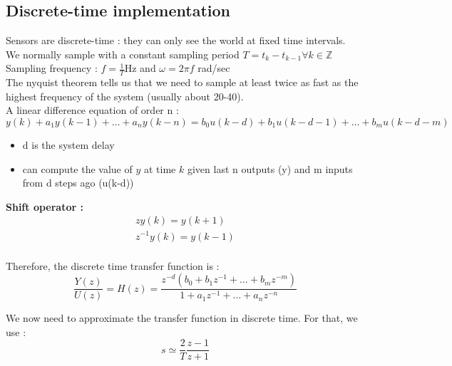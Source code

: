 \documentclass[../main.tex]{subfiles}
\begin{document}
\subsection{Discrete-time implementation}
Sensors are discrete-time : they can only see the world at fixed time intervals.\\

We normally sample with a constant sampling period $T = t_k - t_{k-1} \forall k\in \mathbb{Z}$\\
Sampling frequency : $f = \frac{1}{T}$Hz and $\omega = 2\pi f$ rad/sec\\

The nyquist theorem tells us that we need to sample at least twice as fast as the highest frequency of the system (usually about 20-40).\\

A linear difference equation of order n : \begin{equation}
    y(k) + a_1y(k-1)+ \dots + a_ny(k-n) = b_0 u(k-d) + b_1 u(k-d-1) + \dots + b_m u(k-d-m)
\end{equation}

\begin{itemize}
    \item d is the system delay\\
    \item can compute the value of $y$ at time $k$ given last n outputs (y) and m inputs from d steps ago (u(k-d))\\
\end{itemize}

\textbf{Shift operator :} \begin{equation}
    \begin{gathered}
        zy(k) = y(k+1)\\
        z^{-1}y(k) = y(k-1)\\
    \end{gathered}
\end{equation}

Therefore, the discrete time transfer function is : \begin{equation}
    \frac{Y(z)}{U(z)} = H(z) = \frac{z^{-d}(b_0 + b_1z^{-1}+ \dots + b_m z^{-m})}{1+ a_1z^{-1} + \dots + a_n z^{-n}}
\end{equation}

We now need to approximate the transfer function in discrete time. For that, we use : \begin{equation}
s \simeq \frac{2}{T} \frac{z-1}{z+1}\end{equation}
\end{document}
